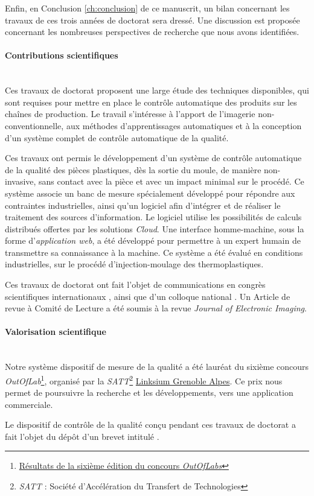 Enfin, en Conclusion \ref{ch:conclusion} de ce manuscrit, un bilan concernant les travaux de ces trois années de doctorat sera dressé.
Une discussion est proposée concernant les nombreuses perspectives de recherche que nous avons identifiées.

\bigskip
\paragraph{Contributions scientifiques}\mbox{} \\
Ces travaux de doctorat proposent une large étude des techniques disponibles, qui sont requises pour mettre en place le contrôle automatique des produits sur les chaînes de production.
Le travail s'intéresse à l'apport de l'imagerie non-conventionnelle, aux méthodes d'apprentissages automatiques et à la conception d'un système complet de contrôle automatique de la qualité.

Ces travaux ont permis le développement d'un système de contrôle automatique de la qualité des pièces plastiques, dès la sortie du moule, de manière non-invasive, sans contact avec la pièce et avec un impact minimal sur le procédé.
Ce système associe un banc de mesure spécialement développé pour répondre aux contraintes industrielles, ainsi qu'un logiciel afin d'intégrer et de réaliser le traitement des sources d'information.
Le logiciel utilise les possibilités de calculs distribués offertes par les solutions \textit{Cloud}.
Une interface homme-machine, sous la forme d'\textit{application web}, a été développé pour permettre à un expert humain de transmettre sa connaissance à la machine.
Ce système a été évalué en conditions industrielles, sur le procédé d'injection-moulage des thermoplastiques.

\bigskip
Ces travaux de doctorat ont fait l’objet de communications en congrès scientifiques internationaux \cite{nagorny_towards_2017, nagorny_injection_2017, nagorny_quality_2017, nagorny_generative_2018, nagorny_polarimetric_2019}, ainsi que d'un colloque national \cite{nagorny_towards_2017}.
Un Article de revue à Comité de Lecture a été soumis à la revue \textit{Journal of Electronic Imaging}.

\bigskip
\paragraph{Valorisation scientifique}\mbox{} \\
Notre système dispositif de mesure de la qualité a été lauréat du sixième concours \textit{OutOfLab}\footnote{\href{http://outoflabs.linksium.fr/resultats/}{Résultats de la sixième édition du concours \textit{OutOfLabs}}}, organisé par la \textit{SATT}\footnote{\textit{SATT} : Société d'Accélération du Transfert de Technologies} \href{https://www.linksium.fr/}{Linksium Grenoble Alpes}.
Ce prix nous permet de poursuivre la recherche et les développements, vers une application commerciale.

Le dispositif de contrôle de la qualité conçu pendant ces travaux de doctorat a fait l'objet du dépôt d'un brevet intitulé  \cite{nagorny_dispositif_2019}.
